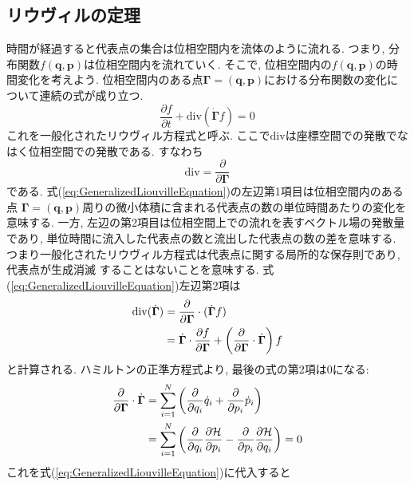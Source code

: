 \subsection{リウヴィルの定理}
時間が経過すると代表点の集合は位相空間内を流体のように流れる.
つまり, 分布関数$f(\bm{q}, \bm{p})$は位相空間内を流れていく.
そこで, 位相空間内の$f(\bm{q},\bm{p})$の時間変化を考えよう.
位相空間内のある点$\bm{\Gamma} = (\bm{q}, \bm{p})$における分布関数の変化について連続の式が成り立つ.
\begin{equation}
 \frac{\partial f}{\partial t} + \mathrm{div}(\dot{\bm{\Gamma}} f) = 0
 \label{eq:GeneralizedLiouvilleEquation}
\end{equation}
これを一般化されたリウヴィル方程式と呼ぶ.
ここで$\mathrm{div}$は座標空間での発散でなはく位相空間での発散である.
すなわち
\begin{equation}
 \mathrm{div} = \frac{\partial}{\partial \bm{\Gamma}}
\end{equation}
である.
式(\ref{eq:GeneralizedLiouvilleEquation})の左辺第1項目は位相空間内のある点
$\bm{\Gamma} = (\bm{q}, \bm{p})$周りの微小体積に含まれる代表点の数の単位時間あたりの変化を意味する.
一方, 左辺の第2項目は位相空間上での流れを表すベクトル場の発散量であり,
単位時間に流入した代表点の数と流出した代表点の数の差を意味する.
つまり一般化されたリウヴィル方程式は代表点に関する局所的な保存則であり, 代表点が生成消滅
することはないことを意味する.
式(\ref{eq:GeneralizedLiouvilleEquation})左辺第2項は
\begin{align}
  \mathrm{div}(\dot{\bm{\Gamma}})
&=\frac{\partial}{\partial \bm{\Gamma}} \cdot (\dot{\bm{\Gamma}} f)
  \notag
  \\
& =\dot{\bm{\Gamma}} \cdot \frac{\partial f}{\partial \bm{\Gamma}}
 +\left( \frac{\partial}{\partial \bm{\Gamma}} \cdot \dot{\bm{\Gamma}} \right) f
\end{align}
と計算される.
ハミルトンの正準方程式より, 最後の式の第2項は0になる:
\begin{align}
  \frac{\partial}{\partial \bm{\Gamma}} \cdot \dot{\bm{\Gamma}}
&=\sum_{i=1}^{N}
  \left(
         \frac{\partial}{\partial q_{i}} \dot{q}_{i}
        +\frac{\partial}{\partial p_{i}} \dot{p}_{i}
  \right)
  \notag
  \\
&=\sum_{i=1}^{N}
  \left(
         \frac{\partial}{\partial q_{i}} \frac{\partial \mathcal{H}}{\partial p_{i}}
        -\frac{\partial}{\partial p_{i}} \frac{\partial \mathcal{H}}{\partial q_{i}}
  \right)
 =0
  \label{eq:GeneralizedLiouvilleEq2}
\end{align}
これを式(\ref{eq:GeneralizedLiouvilleEquation})に代入すると
